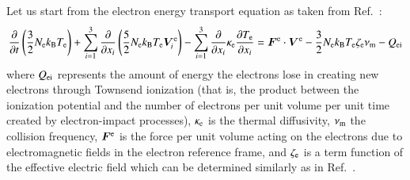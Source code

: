 \documentclass[twoside,onecolumn,10pt]{waflarticle}
\renewcommand{\vec}[1]{\bm{#1}}
\newcommand{\nd}{3}
\renewcommand{\vec}[1]{\bm{ #1 }}
\begin{document}
Let us start from the electron energy transport equation as taken from Ref.\ \cite[page 34]{book:1991:raizer}:
%
\begin{equation}
  \frac{\partial }{\partial t} \left( \frac{3}{2} N_{\rm e} k_{\rm B} T_{\rm e} \right)
  + \sum_{i=1}^\nd \frac{\partial }{\partial x_i} \left(\frac{5}{2}  N_{\rm e} k_{\rm B} T_{\rm e} \vec{V}_i^{\rm e} \right)
  - \sum_{i=1}^\nd \frac{\partial }{\partial x_i} \kappa_{\rm e} \frac{\partial T_{\rm e}}{\partial x_i}
  =
   \vec{F}^{\rm e}\cdot \vec{V}^{\rm e}
 - \frac{3}{2} N_{\rm e} k_{\rm B} T_{\rm e} \zeta_{\rm e} \nu_{\rm m} - Q_{\rm ei}  
 \end{equation}
%
where $Q_{\rm ei}$ represents the amount of energy the electrons lose in creating new electrons through Townsend
ionization (that is, the product between the ionization potential and the number of electrons per unit volume per unit time created by electron-impact processes), $\kappa_{\rm e}$ is the thermal diffusivity, $\nu_{\rm m}$ the collision frequency, $\vec{F}^{\rm e}$ is the force per unit volume acting on the electrons due to electromagnetic fields in the electron reference frame, and $\zeta_{\rm e}$ is a term function of the effective electric field which can be determined similarly as in Ref.\ \cite{misc:1995:boeuf}.
\end{document}
